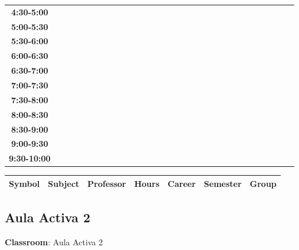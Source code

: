 \documentclass{article}
\begin{document}
\begin{table}[ht]
\begin{tabular}{|c|c|c|c|c|c|c|c|c|c|c|c|c|c|c|c|c|c|c|c|c|c|c|c|c|c|c|c|c|c|}
 \cline{1-8} 
\textbf{4:30-5:00} &   &   &   &   &   &   &   \\
 \cline{1-8} 
\textbf{5:00-5:30} &   &   &   &   &   &   &   \\
 \cline{1-8} 
\textbf{5:30-6:00} &   &   &   &   &   &   &   \\
 \cline{1-8} 
\textbf{6:00-6:30} &   &   &   &   &   &   &   \\
 \cline{1-8} 
\textbf{6:30-7:00} &   &   &   &   &   &   &   \\
 \cline{1-8} 
\textbf{7:00-7:30} &   &   &   &   &   &   &   \\
 \cline{1-8} 
\textbf{7:30-8:00} &   &   &   &   &   &   &   \\
 \cline{1-8} 
\textbf{8:00-8:30} &   &   &   &   &   &   &   \\
 \cline{1-8} 
\textbf{8:30-9:00} &   &   &   &   &   &   &   \\
 \cline{1-8} 
\textbf{9:00-9:30} &   &   &   &   &   &   &   \\
 \cline{1-8} 
\textbf{9:30-10:00} &   &   &   &   &   &   &   \\
 \cline{1-8} 
\end{tabular}\end{table}

        
        \begin{tabular}{|>{\centering\arraybackslash}m{2cm}|>{\centering\arraybackslash}m{4cm}|>{\centering\arraybackslash}m{2.15cm}|>{\centering\arraybackslash}m{1.8cm}|>{\centering\arraybackslash}m{2cm}|>{\centering\arraybackslash}m{2cm}|>{\centering\arraybackslash}m{2cm}|}
        \hline
        \textbf{Symbol} & \textbf{Subject} & \textbf{Professor} & \textbf{Hours} & \textbf{Career} & \textbf{Semester} & \textbf{Group} \\
        \hline
        \end{tabular}
                    

        \newpage
        

        \subsection{Aula Activa 2}
        \vspace*{.1cm}
        
        \begin{flushright}
            {\LARGE \textbf{Classroom}: Aula Activa 2}
        \end{flushright}
        \vspace{1cm}
\end{document}
